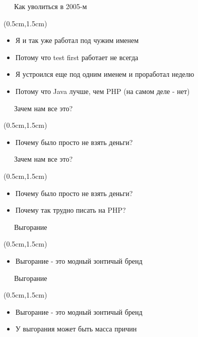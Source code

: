 \documentclass[xetex,18pt,aspectratio=43]{beamer}
\begin{document}
\begin{Large}
\begin{frame}{\ \ \ Как уволиться в 2005-м}
\begin{textblock*}{\framewidth-0.8cm}(0.5cm,1.5cm)
\begin{itemize}
  \item Я и так уже работал под чужим именем
  \item Потому что test first работает не всегда
  \item Я устроился еще под одним именем и проработал неделю
  \item Потому что Java лучше, чем PHP (на самом деле - нет)
\end{itemize}
\end{textblock*}
\end{frame}

\begin{frame}{\ \ \ Зачем нам все это?}
\begin{textblock*}{\framewidth-0.8cm}(0.5cm,1.5cm)
\begin{itemize}
  \item Почему было просто не взять деньги?
\end{itemize}
\end{textblock*}
\end{frame}

\begin{frame}{\ \ \ Зачем нам все это?}
\begin{textblock*}{\framewidth-0.8cm}(0.5cm,1.5cm)
\begin{itemize}
  \item Почему было просто не взять деньги?
  \item Почему так трудно писать на PHP?
\end{itemize}
\end{textblock*}
\end{frame}

\begin{frame}{\ \ \ Выгорание}
\begin{textblock*}{\framewidth-0.8cm}(0.5cm,1.5cm)
\begin{itemize}
  \item Выгорание - это модный зонтичый бренд
\end{itemize}
\end{textblock*}
\end{frame}

\begin{frame}{\ \ \ Выгорание}
\begin{textblock*}{\framewidth-0.8cm}(0.5cm,1.5cm)
\begin{itemize}
  \item Выгорание - это модный зонтичый бренд
  \item У выгорания может быть масса причин
\end{itemize}
\end{textblock*}
\end{frame}


\end{Large}
\end{document}
